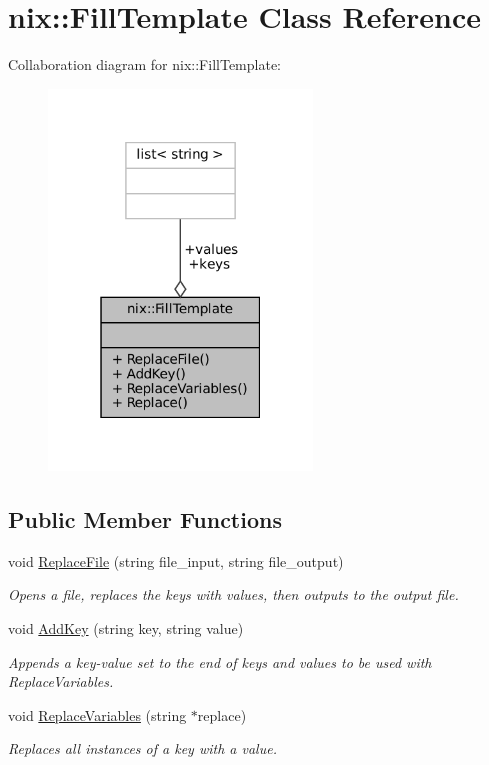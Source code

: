 \hypertarget{classnix_1_1FillTemplate}{}\section{nix\+:\+:Fill\+Template Class Reference}
\label{classnix_1_1FillTemplate}


Collaboration diagram for nix\+:\+:Fill\+Template\+:
\nopagebreak
\begin{figure}[H]
\begin{center}
\leavevmode
\includegraphics[width=199pt]{classnix_1_1FillTemplate__coll__graph}
\end{center}
\end{figure}
\subsection*{Public Member Functions}
\begin{DoxyCompactItemize}
\item 
void \hyperlink{classnix_1_1FillTemplate_a2d219c11fb2c400cb53ea4a94a0c2532}{Replace\+File} (string file\+\_\+input, string file\+\_\+output)
\begin{DoxyCompactList}\small\item\em Opens a file, replaces the keys with values, then outputs to the output file. \end{DoxyCompactList}\item 
void \hyperlink{classnix_1_1FillTemplate_a9f9cfbd663e5a02fa53ee8262d8950c4}{Add\+Key} (string key, string value)
\begin{DoxyCompactList}\small\item\em Appends a key-\/value set to the end of keys and values to be used with Replace\+Variables. \end{DoxyCompactList}\item 
void \hyperlink{classnix_1_1FillTemplate_a34270ff9a51bf5fad588dacf86bd834e}{Replace\+Variables} (string $\ast$replace)
\begin{DoxyCompactList}\small\item\em Replaces all instances of a key with a value. \end{DoxyCompactList}\end{DoxyCompactItemize}
